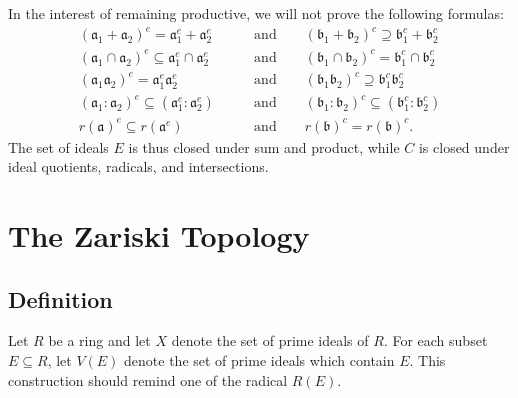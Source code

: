 \documentclass[11pt]{article}
\begin{document}
In the interest of remaining productive, we will not prove the following formulas: 
\begin{align*}
	(\mathfrak{a}_{1} + \mathfrak{a}_{2})^{e} = \mathfrak{a}_{1}^{e} + \mathfrak{a}_{2}^{e} \qquad &\text{and} \qquad (\mathfrak{b}_{1} + \mathfrak{b}_{2})^{c} \supseteq \mathfrak{b}_{1}^{c} + \mathfrak{b}_{2}^{c} \\
	(\mathfrak{a}_{1} \cap \mathfrak{a}_{2})^{e} \subseteq \mathfrak{a}_{1}^{e} \cap \mathfrak{a}_{2}^{e} \qquad &\text{and} \qquad (\mathfrak{b}_{1} \cap \mathfrak{b}_{2})^{c} = \mathfrak{b}_{1}^{c} \cap \mathfrak{b}_{2}^{c}  \\
	(\mathfrak{a}_{1}\mathfrak{a}_{2})^{e} = \mathfrak{a}_{1}^{e}\mathfrak{a}_{2}^{e} \qquad &\text{and} \qquad (\mathfrak{b}_{1}\mathfrak{b}_{2})^{c} \supseteq \mathfrak{b}_{1}^{c}\mathfrak{b}_{2}^{c} \\
	(\mathfrak{a}_{1} : \mathfrak{a}_{2})^{e} \subseteq (\mathfrak{a}_{1}^{e} : \mathfrak{a}_{2}^{e}) \qquad &\text{and} \qquad (\mathfrak{b}_{1} : \mathfrak{b}_{2})^{c} \subseteq (\mathfrak{b}_{1}^{c} : \mathfrak{b}_{2}^{c}) \\
	r(\mathfrak{a})^{e} \subseteq r(\mathfrak{a}^{e}) \qquad &\text{and} \qquad r(\mathfrak{b})^{c} = r(\mathfrak{b})^{c}.
\end{align*}
The set of ideals $E$ is thus closed under sum and product, while $C$ is closed under ideal quotients, radicals, and intersections.


\section{The Zariski Topology}


\subsection{Definition}

Let $R$ be a ring and let $X$ denote the set of prime ideals of $R$. For each subset $E \subseteq R$, let $V(E)$ denote the set of prime ideals which contain $E$. This construction should remind one of the radical $R(E)$.
\end{document}
